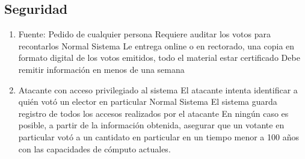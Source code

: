 \subsection{Seguridad}

\begin{enumerate}
 \item {}
{Fuente: Pedido de cualquier persona}
{Requiere auditar los votos para recontarlos}
{Normal}
{Sistema}
{Le entrega online o en rectorado, una copia en formato digital de los votos emitidos, todo el material estar certificado}
{Debe remitir información en menos de una semana}
\medskip

\item {}
{Atacante con acceso privilegiado al sistema}
{El atacante intenta identificar a quién votó un elector en particular}
{Normal}
{Sistema}
{El sistema guarda registro de todos los accesos realizados por el atacante}
{En ningún caso es posible, a partir de la información obtenida, asegurar que un votante en particular votó a un cantidato en particular en un tiempo menor a 100 años con las capacidades de cómputo actuales.}

\end{enumerate}


